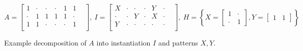 \small
$$
A =
\begin{bmatrix}
1 & \cdot & \cdot & \cdot & 1 & 1 &  \\[-.3em]
\cdot & 1 & 1 & 1 & 1 & \cdot &  \\[-.3em]
1 & 1 & \cdot & \cdot & \cdot & 1 & \\[-.15em]
\end{bmatrix}\!\!, \
I = 
\begin{bmatrix}
X & \cdot & \cdot & \cdot & Y & \cdot & \\[-.3em]
\cdot & \cdot & Y & \cdot & X & \cdot &  \\[-.3em]
Y & \cdot & \cdot & \cdot & \cdot & \cdot & \\[-.15em]
\end{bmatrix}\!\!, \
H = \left\{
X =
\begin{bmatrix}
1 & \cdot \\[-.2em]
\cdot & 1
\end{bmatrix}\!\!,
Y =
\begin{bmatrix}
1 & 1
\end{bmatrix}\right\}
$$
\caption{Example decomposition of $A$ into instantiation $I$ and patterns $X,Y$.}
